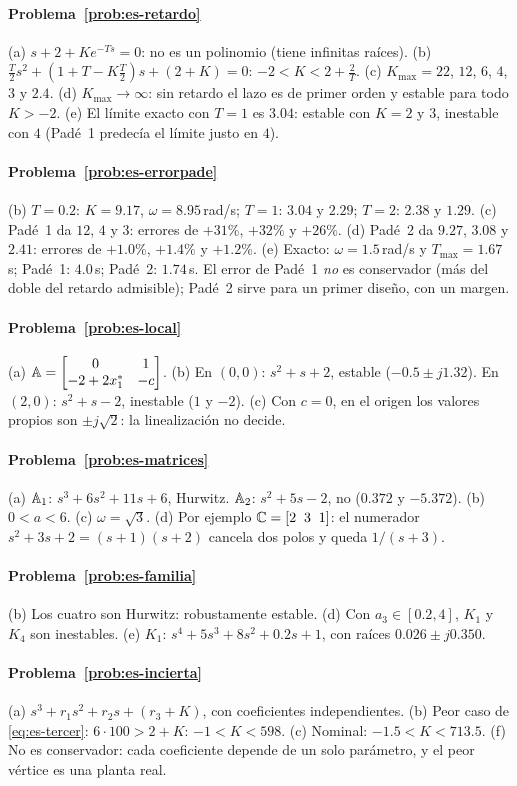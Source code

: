 \paragraph{Problema~\ref{prob:es-retardo}}
(a) $s+2+Ke^{-Ts}=0$: no es un polinomio (tiene infinitas raíces). (b) $\frac{T}{2}s^2+(1+T-K\frac{T}{2})s+(2+K)=0$: $-2<K<2+\frac{2}{T}$. (c) $K_{\max}=22$, $12$, $6$, $4$, $3$ y $2.4$. (d) $K_{\max}\to\infty$: sin retardo el lazo es de primer orden y estable para todo $K>-2$. (e) El límite exacto con $T=1$ es $3.04$: estable con $K=2$ y $3$, inestable con $4$ (Padé~1 predecía el límite justo en $4$).

\paragraph{Problema~\ref{prob:es-errorpade}}
(b) $T=0.2$: $K=9.17$, $\omega=8.95$\,rad/s; $T=1$: $3.04$ y $2.29$; $T=2$: $2.38$ y $1.29$. (c) Padé~1 da $12$, $4$ y $3$: errores de $+31\%$, $+32\%$ y $+26\%$. (d) Padé~2 da $9.27$, $3.08$ y $2.41$: errores de $+1.0\%$, $+1.4\%$ y $+1.2\%$. (e) Exacto: $\omega=1.5$\,rad/s y $T_{\max}=1.67$\,s; Padé~1: $4.0$\,s; Padé~2: $1.74$\,s. El error de Padé~1 \emph{no} es conservador (más del doble del retardo admisible); Padé~2 sirve para un primer diseño, con un margen.

\paragraph{Problema~\ref{prob:es-local}}
(a) $\mathbb{A}=\begin{bmatrix}0&1\\-2+2x_1^*&-c\end{bmatrix}$. (b) En $(0,0)$: $s^2+s+2$, estable ($-0.5\pm j1.32$). En $(2,0)$: $s^2+s-2$, inestable ($1$ y $-2$). (c) Con $c=0$, en el origen los valores propios son $\pm j\sqrt2$: la linealización no decide.

\paragraph{Problema~\ref{prob:es-matrices}}
(a) $\mathbb{A}_1$: $s^3+6s^2+11s+6$, Hurwitz. $\mathbb{A}_2$: $s^2+5s-2$, no ($0.372$ y $-5.372$). (b) $0<a<6$. (c) $\omega=\sqrt3$. (d) Por ejemplo $\mathbb{C}=[2\;\;3\;\;1]$: el numerador $s^2+3s+2=(s+1)(s+2)$ cancela dos polos y queda $1/(s+3)$.

\paragraph{Problema~\ref{prob:es-familia}}
(b) Los cuatro son Hurwitz: robustamente estable. (d) Con $a_3\in[0.2,4]$, $K_1$ y $K_4$ son inestables. (e) $K_1$: $s^4+5s^3+8s^2+0.2s+1$, con raíces $0.026\pm j0.350$.

\paragraph{Problema~\ref{prob:es-incierta}}
(a) $s^3+r_1s^2+r_2s+(r_3+K)$, con coeficientes independientes. (b) Peor caso de \eqref{eq:es-tercer}: $6\cdot100>2+K$: $-1<K<598$. (c) Nominal: $-1.5<K<713.5$. (f) No es conservador: cada coeficiente depende de un solo parámetro, y el peor vértice es una planta real.

\respuestaspausas
